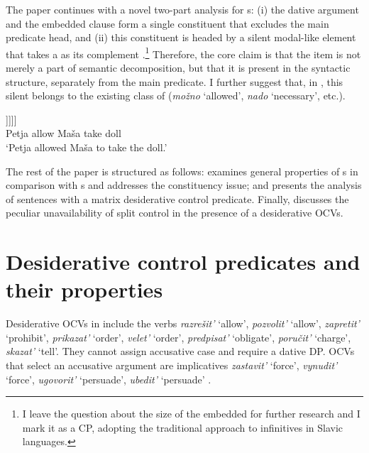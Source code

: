 \documentclass[output=paper,colorlinks,citecolor=brown,newtxmath]{langsci/langscibook}
\begin{document}
\noindent The paper continues with a novel two-part analysis for  s: (i) the {dative argument} and the embedded clause form a single constituent that excludes the main predicate head, and (ii) this constituent is headed by a silent modal-like element that takes a  as its complement .\footnote{I leave the question about the size of the embedded  for further research and I mark it as a CP, adopting the traditional \cite{Lasnik1998} approach to infinitives in Slavic languages.} Therefore, the core claim is that the  item is not merely a part of semantic decomposition, but that it is present in the syntactic structure, separately from the main predicate. I further suggest that, in , this silent  belongs to the existing class of  (\textit{možno} `allowed’, \textit{nado} `necessary’, etc.).

\begin{exe}
\ex\label{ex2}
\gll [\textsubscript{\textit{v}P} Petja [\textsubscript{VP} [\textsubscript{V} razrešil][\textsubscript{ModP} [\hspace{-2pt} Maše$_i$] [\textsubscript{{Mod}$'$} \textit{modal} [\textsubscript{CP} PRO$_i$ vzjat’ kuklu]]]]]\\
{} Petja {} {} allow {} Maša {} {} {} {} take doll\\
\glt `Petja allowed Maša to take the doll.'
\end{exe}

\noindent The rest of the paper is structured as follows:  examines general properties of  s in comparison with s and addresses the constituency issue; and  presents the analysis of sentences with a matrix {desiderative} control predicate. Finally,  discusses the peculiar unavailability of split control in the presence of a {desiderative} OCVs.

\section{Desiderative control predicates and their properties}\label{s2}

Desiderative OCVs in  include the verbs \textit{razrešit’} `allow', \textit{pozvolit’} `allow', \textit{zapretit’} `prohibit', \textit{prikazat’} `order', \textit{velet’} `order', \textit{predpisat’} `obligate', \textit{poručit’} `charge', \textit{skazat’} `tell'. They cannot assign accusative case and require a dative DP. OCVs that select an accusative argument are implicatives \textit{zastavit’} `force', \textit{vynudit’} `force', \textit{ugovorit’} `persuade', \textit{ubedit’} `persuade’ .
\end{document}
